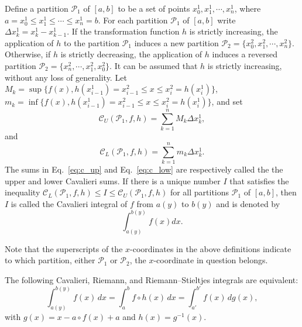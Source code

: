 \documentclass[twoside,reqno,11pt]{fcaa-var} %
\begin{document}
\begin{definition}\label{def:cav_integral}
Define a partition $\mathcal{P}_1$ of $[a,b]$ to be a set of points $x_0^1, x_1^1,\cdots,x_n^1$, 
where $a = x_0^1 \leq x_1^1 \leq \cdots \leq x_n^1 = b$. For each partition 
$\mathcal{P}_1$ of $[a,b]$ write $\Delta x_k^1 = x_k^1-x_{k-1}^1$. 
If the transformation function $h$ is strictly increasing,
the application of $h$ to the partition $\mathcal{P}_1$ induces a new partition $\mathcal{P}_2 = \{x_0^2, x_1^2,\cdots, x_n^2\}$.
Otherwise, if $h$ is strictly decreasing, the application of $h$ induces a reversed partition $\mathcal{P}_2 = \{x_n^2, \cdots, x_1^2,x_0^2\}$. It
can be assumed that $h$ is strictly increasing, without any loss of generality.  Let 
$M_k = \sup \{f (x), h(x_{i-1}^1) = x_{i-1}^2 \leq x \leq x_i^2 = h(x_i^1)\}$, $m_k = \inf \{f (x), h(x_{i-1}^1) = x_{i-1}^2 \leq x \leq x_i^2 = h(x_i^1)\}$, and set 
\begin{equation}
\label{eq:c_up}
\mathcal{C}_U(\mathcal{P}_1,f,h) = \sum_{k=1}^n M_k \Delta x_k^1, 
\end{equation}
and
\begin{equation}
\label{eq:c_low}
\mathcal{C}_L(\mathcal{P}_1,f,h) = \sum_{k=1}^n m_k \Delta x_k^1. 
\end{equation}
The sums in Eq.~\eqref{eq:c_up} and Eq.~\eqref{eq:c_low} are respectively called the the upper and lower Cavalieri sums.
If there is a unique number $I$ that satisfies the inequality $\mathcal{C}_L(\mathcal{P}_1,f,h)\leq I \leq \mathcal{C}_U(\mathcal{P}_1,f,h)$ for all 
partitions $\mathcal{P}_1$ of $[a,b]$, then $I$ is called the Cavalieri integral of $f$ from $a(y)$ to $b(y)$ and is denoted by
\begin{equation}
\int_{a(y)}^{b(y)} f(x) dx.
\end{equation}
\end{definition}

Note that the superscripts of the $x$-coordinates in the above definitions indicate to which partition, either $\mathcal{P}_1$ or $\mathcal{P}_2$, the $x$-coordinate in question belongs.

\begin{theorem}
\label{t:conv}
The following Cavalieri, Riemann, and Riemann--Stieltjes integrals are equivalent:
\begin{equation}
\int_{a(y)}^{b(y)} f(x)\,dx = \int_a^b f\circ h(x)\,dx = \int_{a'}^{b'} f(x)\,dg(x),
\end{equation}
with $g(x) = x-a\circ f(x) + a$ and $h(x) = g^{-1}(x)$.
\end{theorem}
\end{document}
